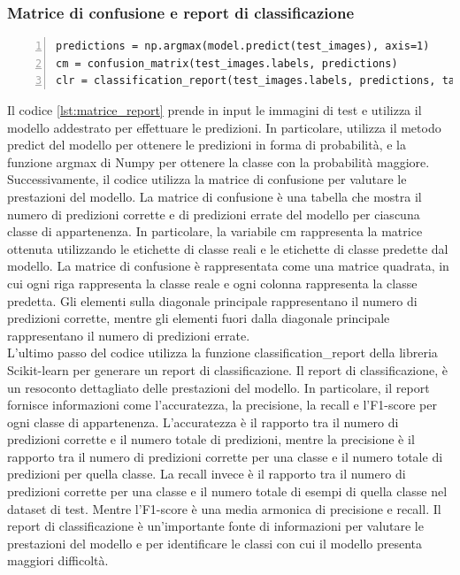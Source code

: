\documentclass[a4paper,final,12pt]{report}
\begin{document}
\subsubsection{Matrice di confusione e report di classificazione}
\begin{lstlisting}[caption={Codice per la creazione della matrice di confusione e del report di classificazione.}, label={lst:matrice_report}, breaklines, escapechar=`\%, frame=lines, basicstyle=\small\ttfamily, keepspaces=true, numbers=left]
predictions = np.argmax(model.predict(test_images), axis=1)
cm = confusion_matrix(test_images.labels, predictions)
clr = classification_report(test_images.labels, predictions, target_names=test_images.class_indices, zero_division=0)
\end{lstlisting}
Il codice \ref{lst:matrice_report} prende in input le immagini di test e utilizza il modello addestrato per effettuare le predizioni. In particolare, utilizza il metodo predict del modello per ottenere le predizioni in forma di probabilità, e la funzione argmax di Numpy per ottenere la classe con la probabilità maggiore.\\
Successivamente, il codice utilizza la matrice di confusione per valutare le prestazioni del modello. La matrice di confusione è una tabella che mostra il numero di predizioni corrette e di predizioni errate del modello per ciascuna classe di appartenenza. In particolare, la variabile cm rappresenta la matrice ottenuta utilizzando le etichette di classe reali e le etichette di classe predette dal modello. La matrice di confusione è rappresentata come una matrice quadrata, in cui ogni riga rappresenta la classe reale e ogni colonna rappresenta la classe predetta. Gli elementi sulla diagonale principale rappresentano il numero di predizioni corrette, mentre gli elementi fuori dalla diagonale principale rappresentano il numero di predizioni errate.\\
L'ultimo passo del codice utilizza la funzione classification\_report della libreria Scikit-learn per generare un report di classificazione.
Il report di classificazione, è un resoconto dettagliato delle prestazioni del modello. In particolare, il report fornisce informazioni come l'accuratezza, la precisione, la recall e l'F1-score per ogni classe di appartenenza. L'accuratezza è il rapporto tra il numero di predizioni corrette e il numero totale di predizioni, mentre la precisione è il rapporto tra il numero di predizioni corrette per una classe e il numero totale di predizioni per quella classe. La recall invece è il rapporto tra il numero di predizioni corrette per una classe e il numero totale di esempi di quella classe nel dataset di test. Mentre l'F1-score è una media armonica di precisione e recall. Il report di classificazione è un'importante fonte di informazioni per valutare le prestazioni del modello e per identificare le classi con cui il modello presenta maggiori difficoltà. 
\newpage
\end{document}
